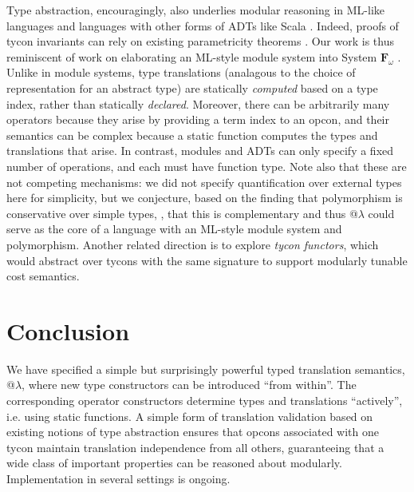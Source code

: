 \documentclass[pldi]{sigplanconf-pldi15}
\begin{document}
Type abstraction, encouragingly, also underlies modular reasoning in ML-like languages \cite{pfpl,harper1997programming} and languages with other forms of ADTs \cite{liskov1974programming} like Scala \cite{conf/oopsla/AminRO14}. Indeed, proofs of tycon invariants can rely on existing parametricity theorems \cite{WadlerThms}. 
Our work is thus reminiscent of  work on elaborating an ML-style module system into System $\mathbf{F}_\omega$ \cite{conf/tldi/RossbergRD10}.  Unlike in module systems, type translations (analagous to the choice of representation for an abstract type) are statically \emph{computed} based on a type index, rather than statically \emph{declared}. Moreover, there can be arbitrarily many operators because they arise by providing a term index to an opcon, and their  semantics can be complex because a static function computes the types and translations that arise. In contrast, modules and ADTs can only specify a fixed number of operations, and each must have function type. Note also that these are not competing mechanisms: we did not specify quantification over external types here for simplicity, but we conjecture, based on the finding that polymorphism is conservative over simple types, \cite{breazu1990polymorphism}, that this is  complementary and thus @$\lambda$ could serve as the core of a language with an ML-style module system and polymorphism. Another related direction is to explore \emph{tycon functors}, which would abstract over tycons with the same signature to support modularly tunable cost semantics. %


\section{Conclusion}
\noindent We have specified a simple but surprisingly powerful typed translation semantics, @$\lambda$, where new type constructors can be introduced ``from within''. The corresponding operator constructors determine types and translations ``actively'', i.e. using static functions. A simple form of translation validation based on existing notions of type abstraction  ensures that opcons associated with one tycon maintain translation independence from all others, guaranteeing that a wide class of important properties can be reasoned about modularly. Implementation in several settings is ongoing.
\end{document}
